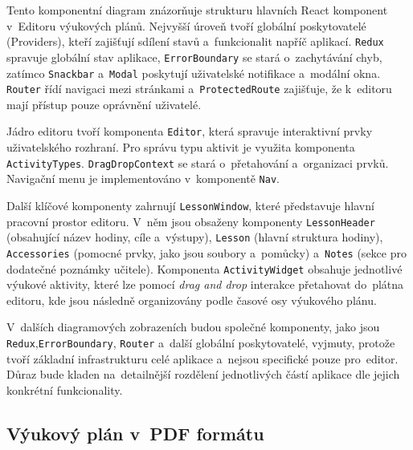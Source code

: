 \documentclass[male,czech,api_bc]{kitheses}
\begin{document}
\newpage

Tento komponentní diagram znázorňuje strukturu hlavních React komponent v~Editoru výukových plánů. Nejvyšší úroveň tvoří globální poskytovatelé (Providers), kteří zajišťují sdílení stavů a~funkcionalit napříč aplikací. \texttt{Redux} spravuje globální stav aplikace, \texttt{ErrorBoundary} se stará o~zachytávání chyb, zatímco \texttt{Snackbar} a~\texttt{Modal} poskytují uživatelské notifikace a~modální okna. \texttt{Router} řídí navigaci mezi stránkami a~\texttt{ProtectedRoute} zajišťuje, že k~editoru mají přístup pouze oprávnění uživatelé.

Jádro editoru tvoří komponenta \texttt{Editor}, která spravuje interaktivní prvky uživatelského rozhraní. Pro správu typu aktivit je využita komponenta \texttt{ActivityTypes}. \texttt{DragDropContext} se stará o~přetahování a~organizaci prvků. Navigační menu je implementováno v~komponentě \texttt{Nav}.

Další klíčové komponenty zahrnují \texttt{LessonWindow}, které představuje hlavní pracovní prostor editoru. V~něm jsou obsaženy komponenty \texttt{LessonHeader} (obsahující název hodiny, cíle a~výstupy), \texttt{Lesson} (hlavní struktura hodiny), \texttt{Accessories} (pomocné prvky, jako jsou soubory a~pomůcky) a~\texttt{Notes} (sekce pro dodatečné poznámky učitele). Komponenta \texttt{ActivityWidget} obsahuje jednotlivé výukové aktivity, které lze pomocí \textit{drag and drop} interakce přetahovat do~plátna editoru, kde jsou následně organizovány podle časové osy výukového plánu.

V~dalších diagramových zobrazeních budou společné komponenty, jako jsou \texttt{Redux},\break\texttt{ErrorBoundary}, \texttt{Router} a~další globální poskytovatelé, vyjmuty, protože tvoří základní infrastrukturu celé aplikace a~nejsou specifické pouze pro~editor. Důraz bude kladen na~detailnější rozdělení jednotlivých částí aplikace dle jejich konkrétní funkcionality.

\subsection{Výukový plán v~PDF formátu}
\end{document}

